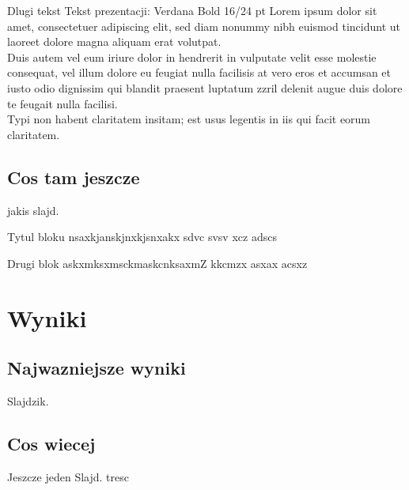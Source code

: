 \documentclass{beamer}
\begin{document}
\begin{frame}{Dlugi tekst}
Tekst prezentacji: Verdana Bold 16/24 pt
Lorem ipsum dolor sit amet, consectetuer adipiscing elit, sed diam nonummy nibh euismod tincidunt ut laoreet dolore magna aliquam erat volutpat. \\

Duis autem vel eum iriure dolor in hendrerit in vulputate velit esse molestie consequat, vel illum dolore eu feugiat nulla facilisis at vero eros et accumsan et iusto odio dignissim qui blandit praesent luptatum zzril delenit augue duis dolore te feugait nulla facilisi. 
\\
Typi non habent claritatem insitam; est usus legentis in iis qui facit eorum claritatem.
\\ 
\end{frame}

\subsection{Cos tam jeszcze}

\begin{frame}{jakis slajd.}

\begin{block}{Tytul bloku}
nsaxkjanskjnxkjsnxakx sdvc
svsv xcz
adscs
\end{block}
\begin{block}{Drugi blok}
askxmksxmsckmaskcnksaxmZ kkcmzx
asxax
acsxz
\end{block}
\end{frame}


\section{Wyniki}

\subsection{Najwazniejsze wyniki}

\begin{frame}{Slajdzik.}
\end{frame}

\subsection{Cos wiecej}

\begin{frame}{Jeszcze jeden Slajd.}
tresc
\end{frame}
\end{document}

